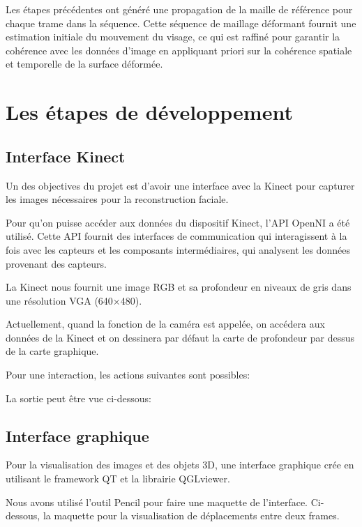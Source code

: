 \documentclass[a4paper,10pt]{article}
\begin{document}
Les étapes précédentes ont généré une propagation de la maille de référence pour chaque trame dans la séquence. Cette séquence de maillage déformant fournit une estimation initiale du mouvement du visage, ce qui est raffiné pour garantir la cohérence avec les données d'image en appliquant priori sur la cohérence spatiale et temporelle de la surface déformée.


\section{Les étapes de développement}
\subsection{Interface Kinect}

Un des objectives du projet est d’avoir une interface avec la Kinect pour capturer les images nécessaires pour la reconstruction faciale.

Pour qu’on puisse accéder aux données du dispositif Kinect, l’API OpenNI a été utilisé. Cette API fournit des interfaces de communication qui interagissent à la fois avec les capteurs et les composants intermédiaires, qui analysent les données provenant des capteurs.

La Kinect nous fournit une image RGB et sa profondeur en niveaux de gris dans une résolution VGA (640×480).

Actuellement, quand la fonction de la caméra est appelée, on accédera aux données de la Kinect et on dessinera par défaut la carte de profondeur par dessus de la carte graphique. 

Pour une interaction, les actions suivantes sont possibles: 


La sortie peut être vue ci-dessous:



\subsection{Interface graphique}

Pour la visualisation des images et des objets 3D, une interface graphique crée en utilisant le framework QT et la librairie QGLviewer. 

Nous avons utilisé l’outil Pencil pour faire une maquette de l’interface. Ci-dessous, la maquette pour la visualisation de déplacements entre deux frames.
\end{document}
